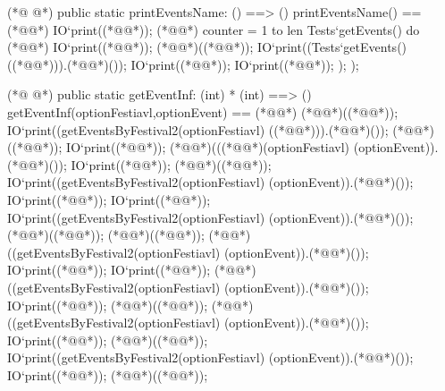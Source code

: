 \begin{vdmpp}[breaklines=true]
(*@
\label{printEventsName:60}
@*)
  public static printEventsName: () ==> ()
  printEventsName() ==
  (*@\vdmnotcovered{(}@*) 
  IO`print((*@@*));
   (*@@*) counter = 1 to len Tests`getEvents() do (*@\vdmnotcovered{(}@*)
   IO`print((*@@*));
   (*@@*)((*@@*));
   IO`print((Tests`getEvents() ((*@@*))).(*@@*)());
   IO`print((*@@*));
   IO`print((*@@*));
  );
 );  
 
(*@
\label{getEventInf:73}
@*)
 public static getEventInf: (int) * (int) ==> ()
  getEventInf(optionFestiavl,optionEvent) ==
  (*@\vdmnotcovered{(}@*) 
  (*@@*)((*@@*));
   IO`print((getEventsByFestival2(optionFestiavl) ((*@@*))).(*@@*)());
   (*@@*)((*@@*));
   IO`print((*@@*));
   (*@@*)(((*@@*)(optionFestiavl) (optionEvent)).(*@@*)());
   IO`print((*@@*));
   (*@@*)((*@@*));
   IO`print((getEventsByFestival2(optionFestiavl) (optionEvent)).(*@@*)());
   IO`print((*@@*));
   IO`print((*@@*));
   IO`print((getEventsByFestival2(optionFestiavl) (optionEvent)).(*@@*)());
   (*@@*)((*@@*));
   (*@@*)((*@@*));
    (*@@*)((getEventsByFestival2(optionFestiavl) (optionEvent)).(*@@*)());
   IO`print((*@@*));
   IO`print((*@@*));
   (*@@*)((getEventsByFestival2(optionFestiavl) (optionEvent)).(*@@*)());
   IO`print((*@@*));
   (*@@*)((*@@*));
   (*@@*)((getEventsByFestival2(optionFestiavl) (optionEvent)).(*@@*)());
   IO`print((*@@*));
   (*@@*)((*@@*));
   IO`print((getEventsByFestival2(optionFestiavl) (optionEvent)).(*@@*)());
   IO`print((*@@*));
   (*@@*)((*@@*));
    

\end{vdmpp}
